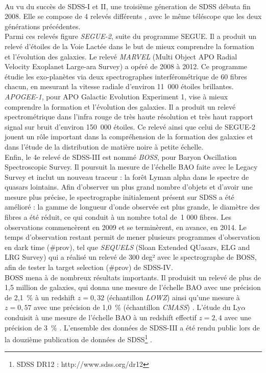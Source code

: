 \documentclass[11pt, twoside, a4paper, openright]{report}
\begin{document}
\paragraph{}
Au vu du succès de SDSS-I et II, une troisième géneration de SDSS débuta fin 2008. Elle se compose de 4 relevés différents \cite{Eisenstein2011}, avec le même téléscope que les deux générations précédentes. \\
Parmi ces relevés figure \emph{SEGUE-2}, suite du programme SEGUE. Il a produit un relevé d'étoiles de la Voie Lactée dans le but de mieux comprendre la formation et l'évolution des galaxies. Le relevé \emph{MARVEL} (Multi Object APO Radial Velocity Exoplanet Large-ara Survey) a opéré de 2008 à 2012. Ce programme étudie les exo-planètes via deux spectrographes interférométrique de 60 fibres chacun, en mesurant la vitesse radiale d'environ 11~000 étoiles brillantes. \emph{APOGEE-1}, pour APO Galactic Evolution Experiment 1, vise à mieux comprendre la formation et l'évolution des galaxies. Il a produit un relevé spectrométrique dans l'infra rouge de très haute résolution et très haut rapport signal sur bruit d'environ 150~000 étoiles. Ce relevé ainsi que celui de SEGUE-2 jouent un rôle important dans la compréhension de la formation des galaxies et dans l'étude de la distribution de matière noire à petite échelle.\\
Enfin, le 4e relevé de SDSS-III est nommé \emph{BOSS}, pour Baryon Oscillation Spectroscopic Survey. Il poursuit la mesure de l'échelle BAO faite avec le Legacy Survey et inclut un nouveau traceur : la forêt Lyman alpha dans le spectre de quasars lointains. Afin d'observer un plus grand nombre d'objets et d'avoir une mesure plus précise, le spectrographe initialement présent sur SDSS a été amélioré : la gamme de longueur d'onde observée est plus grande, le diamètre des fibres a été réduit, ce qui conduit à un nombre total de~1 000 fibres. Les observations commencèrent en 2009 et se terminèrent, en avance, en 2014. Le temps d'observation restant permit de mener plusieurs programmes d'observation en dark time (\#prov), tel que \emph{SEQUELS} (Sloan Extended QUasars, ELG and LRG Survey) qui a réalisé un relevé de 300 deg² avec le spectrographe de BOSS, afin de tester la target selection (\#prov) de SDSS-IV.\\
BOSS mena à de nombreux résultats importants. Il produisit un relevé de plus de 1,5 million de galaxies, qui donna une mesure de l'échelle BAO avec une précision de 2,1~\% à un redshift $z=0,32$ (échantillon \emph{LOWZ}) ainsi qu'une mesure à $z=0,57$ avec une précision de 1,0~\% (échantillon \emph{CMASS}) \cite{Alam2016}. L'étude du Ly$\alpha$ conduisit à une mesure de l'échelle BAO à un redshift effectif $z=2,4$ avec une précision de 3~\% \cite{Bourboux2019}.
L'ensemble des données de SDSS-III a été rendu public lors de la douzième publication de données de SDSS\footnote{SDSS DR12 : http://www.sdss.org/dr12} \cite{Alam2016}.
\end{document}
